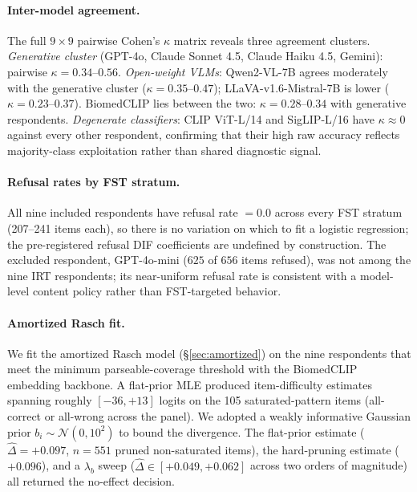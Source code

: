 \documentclass{article}
\begin{document}
\paragraph{Inter-model agreement.}
\label{sec:prelim_kappa}
The full $9 \times 9$ pairwise Cohen's $\kappa$ matrix reveals three agreement clusters. \emph{Generative cluster} (GPT-4o, Claude Sonnet 4.5, Claude Haiku 4.5, Gemini): pairwise $\kappa = 0.34$--$0.56$. \emph{Open-weight VLMs}: Qwen2-VL-7B agrees moderately with the generative cluster ($\kappa = 0.35$--$0.47$); LLaVA-v1.6-Mistral-7B is lower ($\kappa = 0.23$--$0.37$). BiomedCLIP lies between the two: $\kappa = 0.28$--$0.34$ with generative respondents. \emph{Degenerate classifiers}: CLIP ViT-L/14 and SigLIP-L/16 have $\kappa \approx 0$ against every other respondent, confirming that their high raw accuracy reflects majority-class exploitation rather than shared diagnostic signal.

\paragraph{Refusal rates by FST stratum.}
All nine included respondents have refusal rate $= 0.0$ across every FST stratum (207--241 items each), so there is no variation on which to fit a logistic regression; the pre-registered refusal DIF coefficients are undefined by construction. The excluded respondent, GPT-4o-mini ($625$ of $656$ items refused), was not among the nine IRT respondents; its near-uniform refusal rate is consistent with a model-level content policy rather than FST-targeted behavior.

\paragraph{Amortized Rasch fit.}
\label{sec:prelim_irt}
We fit the amortized Rasch model (\S\ref{sec:amortized}) on the nine respondents that meet the minimum parseable-coverage threshold with the BiomedCLIP embedding backbone. A flat-prior MLE produced item-difficulty estimates spanning roughly $[-36, +13]$ logits on the 105 saturated-pattern items (all-correct or all-wrong across the panel). We adopted a weakly informative Gaussian prior $b_i \sim \mathcal{N}(0, 10^2)$ to bound the divergence. The flat-prior estimate ($\hat\Delta = +0.097$, $n = 551$ pruned non-saturated items), the hard-pruning estimate ($+0.096$), and a $\lambda_b$ sweep ($\hat\Delta \in [+0.049, +0.062]$ across two orders of magnitude) all returned the no-effect decision.
\end{document}
